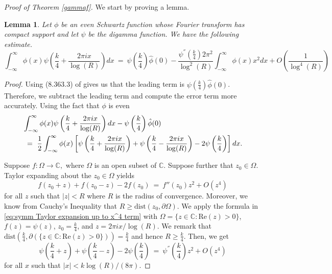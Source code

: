 \documentclass[10pt,a4paper]{amsart}
\newcommand{\C}{\mathbb{C}}
\newcommand{\del}{\partial}
\newtheorem{lemma}{Lemma}
\begin{document}
\textit{Proof of Theorem \ref{gammaf}.} We start by proving a lemma.
\begin{lemma}  Let $\phi$ be an even Schwartz function whose Fourier transform has compact support and let $\psi$ be the digamma function. We have the following estimate.
    \begin{equation}
        \int_{-\infty}^\infty \phi(x)\psi\left(\frac{k}{4}+ \frac{2\pi i x}{\log(R)}\right) dx \ =\ \psi\left(\frac{k}{4}\right)\hat\phi(0) -\frac{\psi^{''}(\frac{k}{4})2\pi^2}{\log^2(R)}\int_{-\infty}^\infty \phi(x)x^2 dx + O\left(\frac{1}{\log^4(R)}\right)
    \end{equation}
\end{lemma}
\begin{proof}
Using (8.363.3) of \cite{GradshteynRyzhik1965} gives us that the leading term is $\psi(\frac{k}{4})\hat\phi(0)$. Therefore, we subtract the leading term and compute the error term more accurately. 
Using the fact that $\phi$ is even
\begin{align}
    &\int_{-\infty}^\infty \phi(x)\psi\left(\frac{k}{4}+ \frac{2\pi i x}{\log(R)}\right) dx - \psi\left(\frac{k}{4}\right)\hat\phi(0)\notag\\ & \ = \
    \frac{1}{2}\int_{-\infty}^\infty \phi(x)\left[\psi\left(\frac{k}{4}+ \frac{2\pi i x}{\log(R)}\right) + \psi\left(\frac{k}{4}- \frac{2\pi i x}{\log(R)}\right) - 2\psi\left(\frac{k}{4}\right)\right]dx. \label{eq:goal 1 what we want di gamma expand}
\end{align}

Suppose $f:\Omega\to \C,$ where $\Omega$ is an open subset of $\C$. Suppose further that $z_0 \in \Omega$. Taylor expanding about the $z_0 \in \Omega$ yields
\begin{equation}\label{eq:symm Taylor expansion up to x^4 term}
    f(z_0+z) + f(z_0-z) - 2f(z_0) \ =\  f''(z_0)z^2 + O(z^4)
\end{equation} for all $z$ such that $|z|<R$ where $R$ is the radius of convergence. Moreover, we know from Cauchy's Inequality that $R \geq \text{dist}(z_0,\del\Omega)$. 
We apply the formula in \eqref{eq:symm Taylor expansion up to x^4 term} with $\Omega = \{z\in\C : \text{Re}(z) > 0\}$, $f(z) = \psi(z)$, $z_0 = \frac{k}{4}$, and $z = 2\pi ix/\log(R)$. We remark that $\text{dist}(\frac{k}{4},\del(\{z\in\C : \text{Re}(z) > 0\})) = \frac{k}{4}$ and hence $R\geq \frac{k}{4}$. Then, we get
\begin{equation}\label{eq:digamma taylor expand}
    \psi\left(\frac{k}{4} + z\right) +  \psi\left(\frac{k}{4} - z\right) - 2 \psi\left(\frac{k}{4}\right) \ =\  \psi^{''}\left(\frac{k}{4}\right) z^2 + O(z^4)
\end{equation} for all $x$ such that $|x|<k\log(R)/(8\pi)$.


\end{proof}
\end{document}
